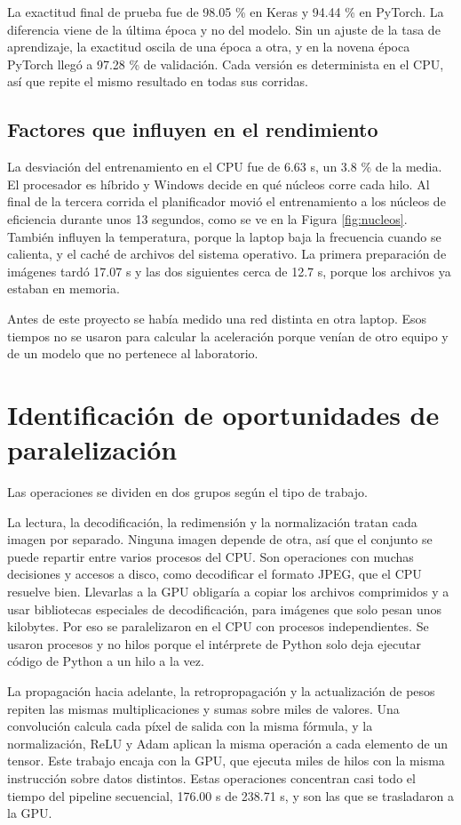 \documentclass[11pt,letterpaper]{article}
\begin{document}
La exactitud final de prueba fue de 98.05 \% en Keras y 94.44 \% en PyTorch. La diferencia viene de la última época y no del modelo. Sin un ajuste de la tasa de aprendizaje, la exactitud oscila de una época a otra, y en la novena época PyTorch llegó a 97.28 \% de validación. Cada versión es determinista en el CPU, así que repite el mismo resultado en todas sus corridas.

\subsection{Factores que influyen en el rendimiento}
La desviación del entrenamiento en el CPU fue de 6.63 s, un 3.8 \% de la media. El procesador es híbrido y Windows decide en qué núcleos corre cada hilo. Al final de la tercera corrida el planificador movió el entrenamiento a los núcleos de eficiencia durante unos 13 segundos, como se ve en la Figura \ref{fig:nucleos}. También influyen la temperatura, porque la laptop baja la frecuencia cuando se calienta, y el caché de archivos del sistema operativo. La primera preparación de imágenes tardó 17.07 s y las dos siguientes cerca de 12.7 s, porque los archivos ya estaban en memoria.

Antes de este proyecto se había medido una red distinta en otra laptop. Esos tiempos no se usaron para calcular la aceleración porque venían de otro equipo y de un modelo que no pertenece al laboratorio.

\section{Identificación de oportunidades de paralelización}
Las operaciones se dividen en dos grupos según el tipo de trabajo.

La lectura, la decodificación, la redimensión y la normalización tratan cada imagen por separado. Ninguna imagen depende de otra, así que el conjunto se puede repartir entre varios procesos del CPU. Son operaciones con muchas decisiones y accesos a disco, como decodificar el formato JPEG, que el CPU resuelve bien. Llevarlas a la GPU obligaría a copiar los archivos comprimidos y a usar bibliotecas especiales de decodificación, para imágenes que solo pesan unos kilobytes. Por eso se paralelizaron en el CPU con procesos independientes. Se usaron procesos y no hilos porque el intérprete de Python solo deja ejecutar código de Python a un hilo a la vez.

La propagación hacia adelante, la retropropagación y la actualización de pesos repiten las mismas multiplicaciones y sumas sobre miles de valores. Una convolución calcula cada píxel de salida con la misma fórmula, y la normalización, ReLU y Adam aplican la misma operación a cada elemento de un tensor. Este trabajo encaja con la GPU, que ejecuta miles de hilos con la misma instrucción sobre datos distintos. Estas operaciones concentran casi todo el tiempo del pipeline secuencial, 176.00 s de 238.71 s, y son las que se trasladaron a la GPU.
\end{document}
